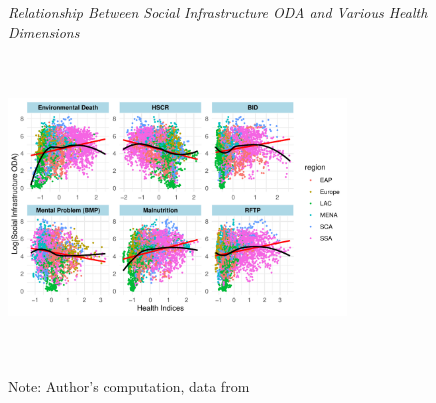 \begin{figure}[H]
\captionsetup{justification=justified,singlelinecheck=false}
\caption{\textit{Relationship Between Social Infrastructure ODA and Various Health Dimensions}}
    \centering \includegraphics[width = 0.8\textwidth, height = 8cm]{Figures/ODA_against_Hth/Soc_ODA_Hth_plt.pdf}
    \label{fig:Social Infrastructure scatterplt}
    \caption*{\footnotesize{Note: Author's computation, data from \textcite{unsdg_sustainable_2023, wdi_world_2023}}}
\end{figure}






